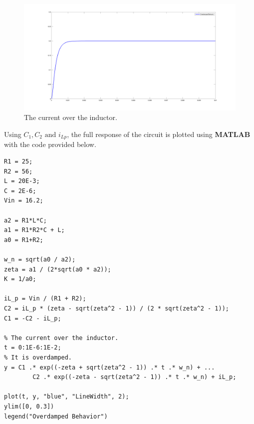 \begin{figure}[H]
    \centering
    \includegraphics[width=\linewidth]{images/evaluation_iL.png}
    \caption{The current over the inductor.}
    \label{fig:evaluation_iL}
\end{figure}

Using $C_1, C_2 \text{ and } i_{Lp}$, the full response of the circuit is plotted using {\bf MATLAB} with the code provided below.
\newpage
\begin{verbatim}
R1 = 25;
R2 = 56;
L = 20E-3;
C = 2E-6;
Vin = 16.2;

a2 = R1*L*C;
a1 = R1*R2*C + L;
a0 = R1+R2;

w_n = sqrt(a0 / a2);
zeta = a1 / (2*sqrt(a0 * a2));
K = 1/a0;

iL_p = Vin / (R1 + R2);
C2 = iL_p * (zeta - sqrt(zeta^2 - 1)) / (2 * sqrt(zeta^2 - 1));
C1 = -C2 - iL_p;

% The current over the inductor.
t = 0:1E-6:1E-2;
% It is overdamped.
y = C1 .* exp((-zeta + sqrt(zeta^2 - 1)) .* t .* w_n) + ...
        C2 .* exp((-zeta - sqrt(zeta^2 - 1)) .* t .* w_n) + iL_p;

plot(t, y, "blue", "LineWidth", 2);
ylim([0, 0.3])
legend("Overdamped Behavior")
\end{verbatim}